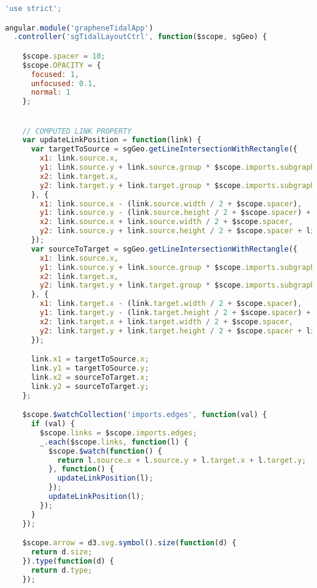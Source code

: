 \begin{lstlisting}[language=JavaScript]
'use strict';

angular.module('grapheneTidalApp')
  .controller('sgTidalLayoutCtrl', function($scope, sgGeo) {

    $scope.spacer = 10;
    $scope.OPACITY = {
      focused: 1,
      unfocused: 0.1,
      normal: 1
    };


    // COMPUTED LINK PROPERTY
    var updateLinkPosition = function(link) {
      var targetToSource = sgGeo.getLineIntersectionWithRectangle({
        x1: link.source.x,
        y1: link.source.y + link.source.group * $scope.imports.subgraph.height,
        x2: link.target.x,
        y2: link.target.y + link.target.group * $scope.imports.subgraph.height
      }, {
        x1: link.source.x - (link.source.width / 2 + $scope.spacer),
        y1: link.source.y - (link.source.height / 2 + $scope.spacer) + link.source.group * $scope.imports.subgraph.height,
        x2: link.source.x + link.source.width / 2 + $scope.spacer,
        y2: link.source.y + link.source.height / 2 + $scope.spacer + link.source.group * $scope.imports.subgraph.height
      });
      var sourceToTarget = sgGeo.getLineIntersectionWithRectangle({
        x1: link.source.x,
        y1: link.source.y + link.source.group * $scope.imports.subgraph.height,
        x2: link.target.x,
        y2: link.target.y + link.target.group * $scope.imports.subgraph.height
      }, {
        x1: link.target.x - (link.target.width / 2 + $scope.spacer),
        y1: link.target.y - (link.target.height / 2 + $scope.spacer) + link.target.group * $scope.imports.subgraph.height,
        x2: link.target.x + link.target.width / 2 + $scope.spacer,
        y2: link.target.y + link.target.height / 2 + $scope.spacer + link.target.group * $scope.imports.subgraph.height
      });

      link.x1 = targetToSource.x;
      link.y1 = targetToSource.y;
      link.x2 = sourceToTarget.x;
      link.y2 = sourceToTarget.y;
    };

    $scope.$watchCollection('imports.edges', function(val) {
      if (val) {
        $scope.links = $scope.imports.edges;
        _.each($scope.links, function(l) {
          $scope.$watch(function() {
            return l.source.x + l.source.y + l.target.x + l.target.y;
          }, function() {
            updateLinkPosition(l);
          });
          updateLinkPosition(l);
        });
      }
    });

    $scope.arrow = d3.svg.symbol().size(function(d) {
      return d.size;
    }).type(function(d) {
      return d.type;
    });




\end{lstlisting}
